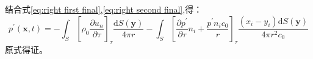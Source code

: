结合式\eqref{eq:right first final},\eqref{eq:right second final},得：
\begin{equation}
    p^{\prime}(\mathbf{x}, t)=-\int_{S}\left[\rho_{0} \frac{\partial u_{n}}{\partial \tau}\right]_{\tau} \frac{\mathrm{d} S(\mathbf{y})}{4 \pi r}-\int_{S}\left[\frac{\partial p^{\prime}}{\partial \tau} n_{i}+\frac{p^{\prime} n_{i} c_{0}}{r}\right]_{\tau} \frac{\left(x_{i}-y_{i}\right) \mathrm{d} S(\mathbf{y})}{4 \pi r^{2} c_{0}}
\end{equation}
原式得证。





